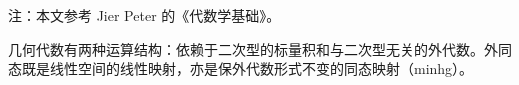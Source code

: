 

注：本文参考 Jier Peter 的《代数学基础》。

几何代数有两种运算结构：依赖于二次型的标量积和与二次型无关的外代数。外同态既是线性空间的线性映射，亦是保外代数形式不变的同态映射（minhg）。